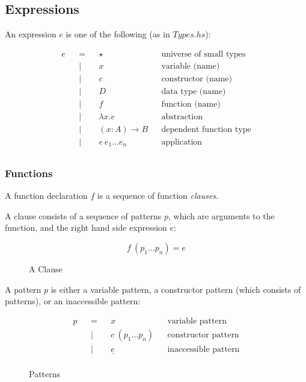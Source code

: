 \documentclass[acmsmall]{acmart}
\begin{document}
\subsection{Expressions}

An expression $e$ is one of the following (as in $Types.hs$):

\begin{equation*}
  \begin{aligned}
    e &  & = &  & \star              &  & \textrm{universe of small types} \\
      &  & | &  & x                  &  & \textrm{variable (name)}         \\
      &  & | &  & c                  &  & \textrm{constructor (name)}      \\
      &  & | &  & D                  &  & \textrm{data type (name)}        \\
      &  & | &  & f                  &  & \textrm{function (name)}         \\
      &  & | &  & \lambda x.e        &  & \textrm{abstraction}             \\
      &  & | &  & (x:A) \to B        &  & \textrm{dependent function type} \\
      &  & | &  & e \: e_1 \dots e_n &  & \textrm{application}             \\
  \end{aligned}
\end{equation*}

\subsubsection{Functions}

A function declaration $f$ is a sequence of function \emph{clauses}. 

A clause consists of a sequence of \textrm{patterns} $p$, which are
arguments to the function, and the right hand side expression $e$:  

\begin{figure}[H]
  \begin{equation*}
    f \: (p_1 \dots p_n) = e
  \end{equation*}
  \caption{A Clause}
\end{figure}

A pattern $p$ is either a variable pattern, a constructor pattern (which
consists of patterns), or an inaccessible pattern:

\begin{figure}[H]
  \begin{equation*}
    \begin{aligned}
      p &  & = &  & x                    &  & \textrm{variable pattern}     \\
        &  & | &  & c \: (p_1 \dots p_n) &  & \textrm{constructor pattern}  \\
        &  & | &  & \underline{e}        &  & \textrm{inaccessible pattern} \\
    \end{aligned}
  \end{equation*}
  \caption{Patterns}
\end{figure}
\end{document}
